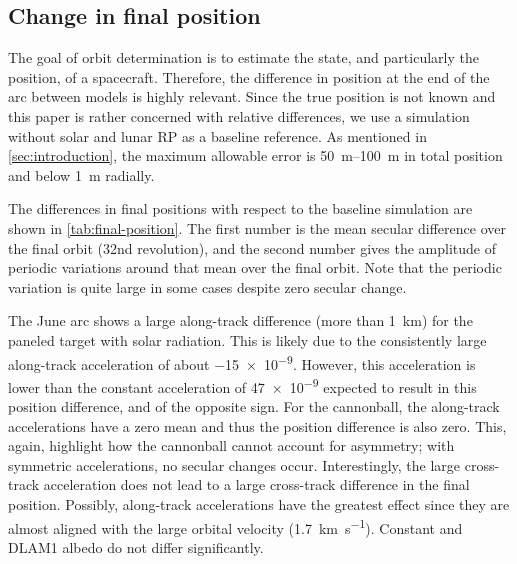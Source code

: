 \subsection{Change in final position}
The goal of orbit determination is to estimate the state, and particularly the position, of a spacecraft. Therefore, the difference in position at the end of the arc between models is highly relevant. Since the true position is not known and this paper is rather concerned with relative differences, we use a simulation without solar and lunar \gls{RP} as a baseline reference. As mentioned in \cref{sec:introduction}, the maximum allowable error is \qtyrange{50}{100}{\m} in total position and below \qty{1}{\m} radially.

\begin{table}[tb]
    \caption{Difference of final position in \unit{\m} with respect to no-\gls{RP} baseline, given as mean over the final orbit plus/minus periodic variations around that mean in the final orbit. The largest changes are in the along-track position. $\mathbf{A}$: solar only; $\mathbf{B}$: lunar only (thermal + constant albedo); $\mathbf{C}$: lunar only (thermal + \gls{DLAM1} albedo); $\mathbf{D}$: solar + lunar (thermal + \gls{DLAM1} albedo).}
    \label{tab:final-position}
    \begin{subtable}[c]{\textwidth}
        
     \end{subtable}

     \medskip

     \begin{subtable}[c]{\textwidth}
        
     \end{subtable}
\end{table}

The differences in final positions with respect to the baseline simulation are shown in \cref{tab:final-position}. The first number is the mean secular difference over the final orbit (32nd revolution), and the second number gives the amplitude of periodic variations around that mean over the final orbit. Note that the periodic variation is quite large in some cases despite zero secular change.

The June arc shows a large along-track difference (more than \qty{1}{\km}) for the paneled target with solar radiation. This is likely due to the consistently large along-track acceleration of about \qty{-15e-9}{\acc}. However, this acceleration is lower than the constant acceleration of \qty{47e-9}{\acc} expected to result in this position difference, and of the opposite sign. For the cannonball, the along-track accelerations have a zero mean and thus the position difference is also zero. This, again, highlight how the cannonball cannot account for asymmetry; with symmetric accelerations, no secular changes occur. Interestingly, the large cross-track acceleration does not lead to a large cross-track difference in the final position. Possibly, along-track accelerations have the greatest effect since they are almost aligned with the large orbital velocity (\qty{1.7}{\km\per\s}). Constant and \gls{DLAM1} albedo do not differ significantly.

